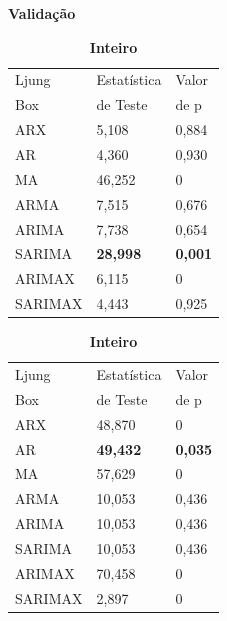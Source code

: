 \begin{table}[H]
	\begin{subtable}{0.49\linewidth}
		\centering
		\caption{\textbf{Validação}} \label{tb:lbvld}
		\begin{tabular}{@{}lll@{}}
			\toprule
			Ljung  & Estatística  & Valor \\
			Box & de Teste& de p\\\midrule
			ARX & 5,108 & 0,884 \\
			AR & 4,360 & 0,930 \\
			MA & 46,252 & 0 \\
			ARMA & 7,515 & 0,676 \\
			ARIMA & 7,738 & 0,654 \\
			SARIMA & \textbf{28,998} & \textbf{0,001} \\
			ARIMAX & 6,115 & 0 \\
			SARIMAX & 4,443 & 0,925 \\ \bottomrule
		\end{tabular}
	\end{subtable}
	\hfill
	\begin{subtable}{0.49\linewidth}
		\centering
		\caption{\textbf{Inteiro}} \label{tb:lbcm}
		\begin{tabular}{@{}lll@{}}
			\toprule
			Ljung  & Estatística  & Valor \\
			Box & de Teste& de p\\\midrule
			ARX &48,870 & 0 \\
			AR & \textbf{49,432} & \textbf{0,035} \\
			MA & 57,629 & 0 \\
			ARMA & 10,053 & 0,436 \\
			ARIMA & 10,053 & 0,436 \\
			SARIMA & 10,053 & 0,436 \\
			ARIMAX & 70,458 & 0 \\
			SARIMAX & 2,897 & 0 \\ \bottomrule
		\end{tabular}
	\end{subtable}
	
	
	\vspace{0.5cm}
	
\end{table}





